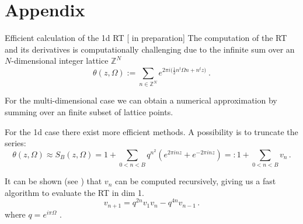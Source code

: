 \documentclass[10pt]{beamer}
\begin{document}

    
        


\section{Appendix }
\begin{frame}{Efficient calculation of the 1d RT \hfill \small [\cite{new} in preparation]}
    The computation of the RT and its derivatives is computationally challenging due to the infinite sum over 
    an $N$-dimensional integer lattice $\mathbb{Z}^N$
    \begin{equation*}
        \theta ( z, \Omega) :=
        \sum_{n \in \mathbb{Z}^N} e^{2 \pi i \big( \frac{1}{2}n^t \Omega n + n^t z \big)} \ .
    \end{equation*}

    For the multi-dimensional case we can obtain a numerical approximation by summing over an finite subset of lattice points.

    For the 1d case there exist more efficient methods.
    A possibility is to truncate the series:
    \begin{equation*}
        \theta ( z, \Omega) \approx S_B(z, \Omega) = 1 + \sum_{0 < n < B}  q^{n^2} (e^{2 \pi i n z} + e^{- 2 \pi i n z}) =: 
        1 + \sum_{0 < n < B} v_n \, .
    \end{equation*}


    It can be shown (see \cite{theta}) that $v_n$ can be computed recursively, giving us a fast algorithm to evaluate
    the RT in dim 1.
    \begin{equation}
            v_{n+1} = q^{ 2 n} v_1 v_n - q^{4 n} v_{n-1} \,. 
        \end{equation}
        where  $q = e^{i \pi \Omega}$ .
\end{frame}
\end{document}
